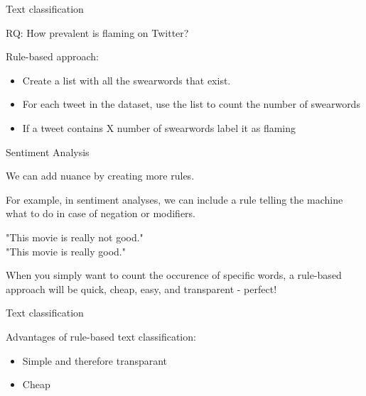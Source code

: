 \documentclass[compress]{beamer}
\begin{document}
\begin{frame}[fragile]{Text classification}
	
RQ: How prevalent is flaming on Twitter?
	
\pause
\normalsize
	
\begin{alertblock}{Rule-based approach:}
	\begin{itemize}
	\item Create a list with all the swearwords that exist.
	\item For each tweet in the dataset, use the list to count the number of swearwords	
	\item If a tweet contains X number of swearwords label it as flaming
	\end{itemize}
\end{alertblock}
\end{frame}


\begin{frame}[fragile]{Sentiment Analysis}

We can add nuance by creating more rules.

\pause

For example, in sentiment analyses, we can include a rule telling the machine what to do in case of negation or modifiers.

"This movie is really not good." \\
"This movie is really good." 

\pause

When you simply want to count the occurence of specific words, a rule-based approach will be quick, cheap, easy, and transparent - perfect!

\end{frame}


\begin{frame}[fragile]{Text classification}
	
\begin{alertblock}{Advantages of rule-based text classification:}
	\begin{itemize}
		\item Simple and therefore transparant
		\item Cheap
	\end{itemize}

\end{alertblock}
\end{frame}
\end{document}
